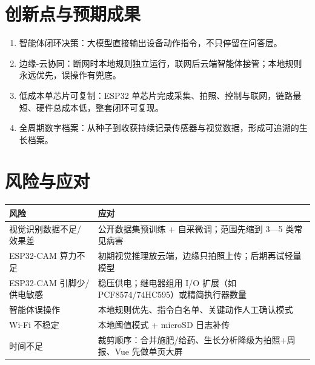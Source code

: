 \documentclass[11pt]{ctexart}
\begin{document}
\section{创新点与预期成果}
\begin{enumerate}
  \item 智能体闭环决策：大模型直接输出设备动作指令，不只停留在问答层。
  \item 边缘-云协同：断网时本地规则独立运行，联网后云端智能体接管；本地规则永远优先，误操作有兜底。
  \item 低成本单芯片可复制：ESP32 单芯片完成采集、拍照、控制与联网，链路最短、硬件总成本低，整套闭环可复现。
  \item 全周期数字档案：从种子到收获持续记录传感器与视觉数据，形成可追溯的生长档案。
\end{enumerate}

\section{风险与应对}
\begin{longtable}{p{5.2cm}p{10.0cm}}
  \toprule
  风险 & 应对 \\
  \midrule
  视觉识别数据不足/效果差 & 公开数据集预训练 + 自采微调；范围先缩到 3—5 类常见病害 \\
  ESP32-CAM 算力不足 & 初期视觉推理放云端，边缘只拍照上传；后期再试轻量模型 \\
  ESP32-CAM 引脚少/供电敏感 & 稳压供电；继电器组用 I/O 扩展（如 PCF8574/74HC595）或精简执行器数量 \\
  智能体误操作 & 本地规则优先、指令白名单、关键动作人工确认模式 \\
  Wi-Fi 不稳定 & 本地阈值模式 + microSD 日志补传 \\
  时间不足 & 裁剪顺序：合并施肥/给药、生长分析降级为拍照+周报、Vue 先做单页大屏 \\
  \bottomrule
\end{longtable}
\end{document}
